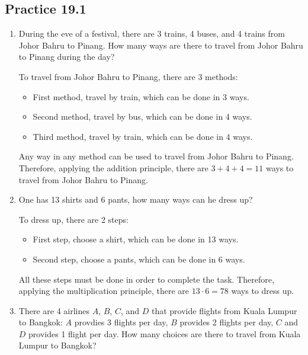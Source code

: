 \documentclass{report}
\begin{document}
\begin{multicols}{2}
  \subsection{Practice 19.1}
  \begin{enumerate}
    \item During the eve of a festival, there are 3 trains, 4 buses, and 4 trains from
          Johor Bahru to Pinang. How many ways are there to travel from Johor Bahru to
          Pinang during the day? \sol{}

          To travel from Johor Bahru to Pinang, there are 3 methods:
          \begin{itemize}
            \item First method, travel by train, which can be done in 3 ways.
            \item Second method, travel by bus, which can be done in 4 ways.
            \item Third method, travel by train, which can be done in 4 ways.
          \end{itemize}
          Any way in any method can be used to travel from Johor Bahru to Pinang. Therefore, applying the addition principle, there are $3 + 4 + 4 = 11$ ways to travel from Johor Bahru to Pinang.

    \item One has 13 shirts and 6 pants, how many ways can he dress up? \sol{}

          To dress up, there are 2 steps:
          \begin{itemize}
            \item First step, choose a shirt, which can be done in 13 ways.
            \item Second step, choose a pants, which can be done in 6 ways.
          \end{itemize}
          All these steps must be done in order to complete the task. Therefore, applying the multiplication principle, there are $13 \cdot 6 = 78$ ways to dress up.

    \item There are 4 airlines $A$, $B$, $C$, and $D$ that provide flights from Kuala
          Lumpur to Bangkok: $A$ provdies 3 flights per day, $B$ provides 2 flights per
          day, $C$ and $D$ provides 1 flight per day. How many choices are there to
          travel from Kuala Lumpur to Bangkok? \sol{}


\end{enumerate}
\end{multicols}
\end{document}
